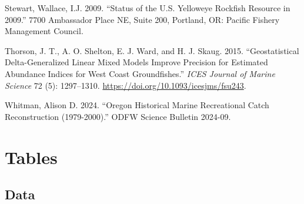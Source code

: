 \documentclass[
]{scrartcl}
\newlength{\cslhangindent}
\newenvironment{CSLReferences}[2] %
 {\begin{list}{}{%
  \setlength{\itemindent}{0pt}
  \setlength{\leftmargin}{0pt}
  \setlength{\parsep}{0pt}
  \ifodd #1
   \setlength{\leftmargin}{\cslhangindent}
   \setlength{\itemindent}{-1\cslhangindent}
  \fi
  \setlength{\itemsep}{#2\baselineskip}}}
 {\end{list}}
\begin{document}
\begin{CSLReferences}{1}{0}
Stewart, Wallace, I.J. 2009. {``Status of the {U}.{S}. Yelloweye
Rockfish Resource in 2009.''} 7700 Ambassador Place NE, Suite 200,
Portland, OR: Pacific Fishery Management Council.

Thorson, J. T., A. O. Shelton, E. J. Ward, and H. J. Skaug. 2015.
{``Geostatistical Delta-Generalized Linear Mixed Models Improve
Precision for Estimated Abundance Indices for {West} {Coast}
Groundfishes.''} \emph{ICES Journal of Marine Science} 72 (5):
1297--1310. \url{https://doi.org/10.1093/icesjms/fsu243}.

Whitman, Alison D. 2024. {``Oregon Historical Marine Recreational Catch
Reconstruction (1979-2000).''} ODFW Science Bulletin 2024-09.

\end{CSLReferences}

\newpage{}

\section{Tables}\label{tables}

\subsection{Data}\label{data-1}
\end{document}

